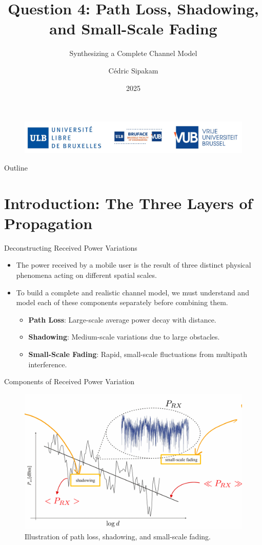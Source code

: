 \documentclass{beamer}
\title[Signal Propagation Models]{Question 4: Path Loss, Shadowing, and Small-Scale Fading}
\subtitle{Synthesizing a Complete Channel Model}
\author{Cédric Sipakam}
\institute{ULB | VUB \\
	\vspace{1.5em}
	ELEC-H415: Communication Channels}
\date{2025}
\begin{document}
	\begin{frame}
		\begin{figure}
			\centering
			\includegraphics[width=0.7\linewidth]{pictures/logos}
		\end{figure}
		\titlepage
	\end{frame}
	
	\begin{frame}{Outline}
		\tableofcontents
	\end{frame}
	
	\section{Introduction: The Three Layers of Propagation}
	
	\begin{frame}{Deconstructing Received Power Variations}
		\begin{itemize}
			\item The power received by a mobile user is the result of three distinct physical phenomena acting on different spatial scales.
			\item To build a complete and realistic channel model, we must understand and model each of these components separately before combining them.
			\begin{itemize}
				\item \textbf{Path Loss}: Large-scale average power decay with distance.
				\item \textbf{Shadowing}: Medium-scale variations due to large obstacles.
				\item \textbf{Small-Scale Fading}: Rapid, small-scale fluctuations from multipath interference.
			\end{itemize}
		\end{itemize}
	\end{frame}
	
	\begin{frame}{Components of Received Power Variation}
		\begin{figure}
			\centering
			\includegraphics[width=0.8\linewidth]{"pictures/power-components.png"}
			\caption{Illustration of path loss, shadowing, and small-scale fading.}
		\end{figure}
	\end{frame}
	
\end{document}
